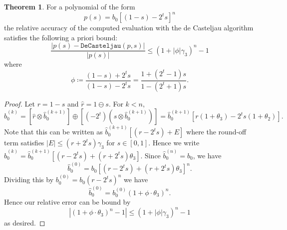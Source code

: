 \documentclass[letterpaper,10pt]{article}
\theoremstyle{definition}
\newtheorem{theorem}{Theorem}[section]
\begin{document}
\begin{theorem}\label{thm:better-error}
For a polynomial of the form
\begin{equation}
p(s) = b_0 \left[(1 - s) - 2^t s\right]^n
\end{equation}
the relative accuracy of the computed
evaluation with the de Casteljau algorithm satisfies
the following a priori bound:
\begin{equation}\label{better-de-casteljau-error}
\frac{\left|p(s) - \mathtt{DeCasteljau}(p, s)\right|}{\left|p(s)\right|}
  \leq \left(1 + \left|\phi\right| \gamma_3\right)^n - 1
\end{equation}
where
\begin{equation}
\phi \coloneqq \frac{(1 - s) + 2^t s}{(1 - s) - 2^t s} =
  \frac{1 + \left(2^t - 1\right) s}{1 - \left(2^t + 1\right) s}.
\end{equation}
\end{theorem}

\begin{proof}
Let \(r = 1 - s\) and \(\widehat{r} = 1 \ominus s\).
For \(k < n\),
\begin{equation}
\widehat{b}_0^{(k)} = \left[\widehat{r} \otimes
  \widehat{b}_0^{(k + 1)}\right] \oplus \left[\left(-2^t\right)
  \left(s \otimes \widehat{b}_0^{(k + 1)}\right)\right] =
  \widehat{b}_0^{(k + 1)} \left[r(1 + \theta_3) - 2^t s(1 + \theta_2)\right].
\end{equation}
Note that this can be written as \(\widehat{b}_0^{(k + 1)}
\left[\left(r - 2^t s\right) + E\right]\) where the round-off term
satisfies \(\left|E\right| \leq \left(r + 2^t s\right) \gamma_3\) for
\(s \in \left[0, 1\right]\). Hence we write
\(\widehat{b}_0^{(k)} = \widehat{b}_0^{(k + 1)} \left[\left(r - 2^t s\right) +
  \left(r + 2^t s\right)\theta_3\right]\).
Since \(\widehat{b}_0^{(n)} = b_0\), we have
\begin{equation}
\widehat{b}_0^{(0)} = b_0 \left[\left(r - 2^t s\right) +
  \left(r + 2^t s\right)\theta_3\right]^n.
\end{equation}
Dividing this by \(b_0^{(0)} = b_0 \left(r - 2^t s\right)^n\) we have
\begin{equation}
\widehat{b}_0^{(0)} = b_0^{(0)} \left(1 + \phi \cdot \theta_3\right)^n.
\end{equation}
Hence our relative error can be bound by
\begin{equation}
\left|\left(1 + \phi \cdot \theta_3\right)^n - 1\right| \leq
\left(1 + \left|\phi\right| \gamma_3\right)^n - 1
\end{equation}
as desired.
\end{proof}
\end{document}
